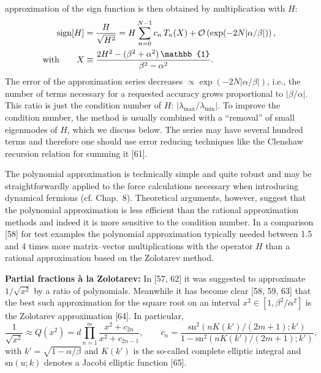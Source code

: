 approximation of the sign function is then obtained by multiplication with $H$:
\begin{align}
  \mathrm{sign}[H] &= \frac{H}{\sqrt{H^2}}
  = H\sum_{n=0}^{N-1} c_n\,T_n(X)
    + \order{\exp(-2N|\alpha/\beta|)}, \notag\\
  \text{with} \qquad
  X &\equiv \frac{2H^2 - (\beta^2+\alpha^2)\,\mathbb{1}}{\beta^2-\alpha^2} .
\end{align}
The error of the approximation series decreases
$\propto \exp(-2N|\alpha/\beta|)$, i.e., the number of terms necessary for a
requested accuracy grows proportional to $|\beta/\alpha|$. This ratio is just
the condition number of $H$: $|\lambda_{\max}/\lambda_{\min}|$. To improve the
condition number, the method is usually combined with a ``removal'' of small
eigenmodes of $H$, which we discuss below. The series may have several hundred
terms and therefore one should use error reducing techniques like the Clenshaw
recursion relation for summing it [61].

The polynomial approximation is technically simple and quite robust and may be
straightforwardly applied to the force calculations necessary when introducing
dynamical fermions (cf. Chap.~8). Theoretical arguments, however, suggest that
the polynomial approximation is less efficient than the rational approximation
methods and indeed it is more sensitive to the condition number. In a
comparison [58] for test examples the polynomial approximation typically
needed between 1.5 and 4 times more matrix--vector multiplications with the
operator $H$ than a rational approximation based on the Zolotarev method.

\textbf{Partial fractions \`a la Zolotarev:} In [57, 62] it was suggested to
approximate $1/\sqrt{x^2}$ by a ratio of polynomials. Meanwhile it has become
clear [58, 59, 63] that the best such approximation for the square root on an
interval $x^2 \in [1, \beta^2/\alpha^2]$ is the Zolotarev approximation [64].
In particular,
\begin{equation}
  \frac{1}{\sqrt{x^2}} \approx Q(x^2) = d\prod_{n=1}^{m}
  \frac{x^2 + c_{2n}}{x^2 + c_{2n-1}},
  \qquad
  c_n = \frac{\mathrm{sn}^2\left(nK(k')/(2m+1); k'\right)}
              {1 - \mathrm{sn}^2\left(nK(k')/(2m+1); k'\right)},
\end{equation}
with $k' = \sqrt{1-\alpha/\beta}$ and $K(k')$ is the so-called complete
elliptic integral and $\mathrm{sn}(u; k)$ denotes a Jacobi elliptic function
[65].

